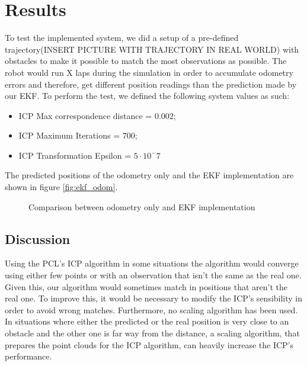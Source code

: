 \section{Results}
\label{sec:Results}


To test the implemented system, we did a setup of a pre-defined trajectory(INSERT PICTURE WITH TRAJECTORY IN REAL WORLD) with obstacles to make it possible to match the most observations as possible. The robot would run X laps during the simulation in order to accumulate odometry errors and therefore, get different position readings than the prediction made by our EKF. To perform the test, we defined the following system values as such:
\begin{itemize}
\item ICP Max correspondence distance = $0.002$;
\item ICP Maximum Iterations = $700$;
\item ICP Transformation Epsilon = $5 \cdot 10^-7$
\end{itemize}
The predicted positions of the odometry only and the EKF implementation are shown in figure \ref{fig:ekf_odom}.\begin{figure}[h]
	\centering
	\newlength\figureheight 
	\newlength\figurewidth 
	\setlength\figureheight{6cm} 
	\setlength\figurewidth{7cm}
	
      \caption{Comparison between odometry only and EKF implementation}	  
      \label{fig:Auftriebspolare} 
\end{figure}


\subsection{Discussion}
\label{subsec:Discussion}
Using the PCL’s ICP algorithm in some situations the algorithm would converge using either few points or with an observation that isn’t the same as the real one. Given this, our algorithm would sometimes match in positions that aren’t the real one. To improve this, it would be necessary to modify the ICP’s sensibility in order to avoid wrong matches.
Furthermore, no scaling algorithm has been used. In situations where either the predicted or the real position is very close to an obstacle and the other one is far way from the distance, a scaling algorithm, that prepares the point clouds for the ICP algorithm, can heavily increase the ICP's performance.

